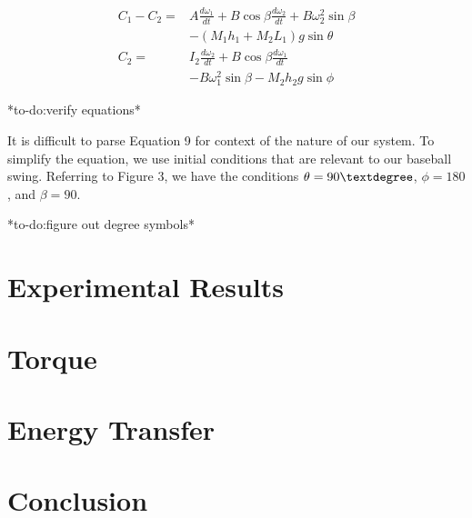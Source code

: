 \documentclass[%
 aip,
 amsmath,amssymb,
 reprint,%
 floatfix,%
]{revtex4-1}
\begin{document}
\begin{equation}
	\begin{aligned}
		C_1 - C_2 = & A \frac{d \omega_1}{dt} + B \cos{\beta} \frac{d \omega_2}{dt} + B \omega_2^2 \sin{\beta} \\
			    & -(M_1 h_1 + M_2 L_1) g \sin{\theta}\\
		C_2 = & I_2 \frac{d \omega_2}{dt} + B \cos{\beta} \frac{d \omega_1}{dt} \\
		      & -B \omega_1^2 \sin{\beta} -M_2 h_2 g \sin{\phi}
	\end{aligned}
\end{equation}

*to-do:verify equations*

It is difficult to parse Equation 9 for context of the nature of our system. To simplify the equation, we use initial conditions that are relevant to our baseball swing. Referring to Figure 3, we have the conditions $\theta=90\textdegree $, $\phi=180$, and $\beta=90$.

*to-do:figure out degree symbols*

\section{\label{sec:level3}Experimental Results}

\section{\label{sec:level4}Torque}

\section{\label{sec:level5}Energy Transfer}

\section{\label{sec:level6}Conclusion}

\nocite{*}
\end{document}
